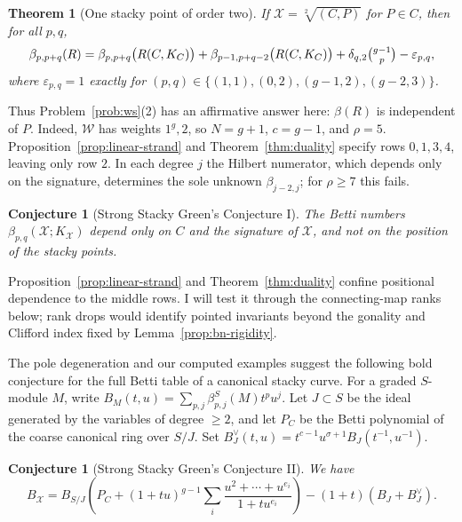 \documentclass[11pt,reqno]{amsart}
\newtheorem{theorem}[lemma]{Theorem}
\newtheorem{conjecture}[lemma]{Conjecture}
\theoremstyle{remark}
\newcommand{\cW}{\mathcal{W}}
\newcommand{\cX}{\mathcal{X}}
\begin{document}
\begin{theorem}[One stacky point of order two]\label{thm:order-two}
If $\cX=\sqrt[2]{(C,P)}$ for $P\in C$, then for all $p,q$,
\[
\beta_{p,p+q}(R)
=\beta_{p,p+q}\big(R(C,K_C)\big)
+\beta_{p-1,p+q-2}\big(R(C,K_C)\big)
+\delta_{q,2}\tbinom{g-1}{p}
-\varepsilon_{p,q},
\]
where $\varepsilon_{p,q}=1$ exactly for
$(p,q)\in\{(1,1),(0,2),(g-1,2),(g-2,3)\}$.
\end{theorem}

Thus Problem~\ref{prob:ws}(2) has an affirmative answer here: $\beta(R)$ is independent of $P$. Indeed, $\cW$ has weights $1^g,2$, so $N=g+1$, $c=g-1$, and $\rho=5$. Proposition~\ref{prop:linear-strand} and Theorem~\ref{thm:duality} specify rows $0,1,3,4$, leaving only row $2$. In each degree $j$ the Hilbert numerator, which depends only on the signature, determines the sole unknown $\beta_{j-2,j}$; for $\rho\geq7$ this fails.
 
\begin{conjecture}[Strong Stacky Green's Conjecture I]\label{conj:middle-I}
The Betti numbers $\beta_{p,q}(\cX;K_{\cX})$ depend only on $C$ and the signature of $\cX$, and not on the position of the stacky points.
\end{conjecture}

Proposition~\ref{prop:linear-strand} and Theorem~\ref{thm:duality} confine positional dependence to the middle rows. I will test it through the connecting-map ranks below; rank drops would identify pointed invariants beyond the gonality and Clifford index fixed by Lemma~\ref{prop:bn-rigidity}.



The pole degeneration and our computed examples suggest the following bold conjecture for the full Betti table of a canonical stacky curve. For a graded $S$-module $M$, write $B_M(t,u)=\sum_{p,j}\beta^S_{p,j}(M)t^pu^j$. Let $J\subset S$ be the ideal generated by the variables of degree $\geq 2$, and let $P_C$ be the Betti polynomial of the coarse canonical ring over $S/J$. Set $B_J^\vee(t,u)=t^{c-1}u^{\sigma+1}B_J(t^{-1},u^{-1})$.

\begin{conjecture}[Strong Stacky Green's Conjecture II]\label{conj:middle}
We have
\[
B_\cX
=B_{S/J}\left(
P_C+(1+tu)^{g-1}
\sum_i\frac{u^2+\cdots+u^{e_i}}{1+tu^{e_i}}
\right)-(1+t)(B_J+B_J^\vee).
\]
\end{conjecture}
\end{document}
